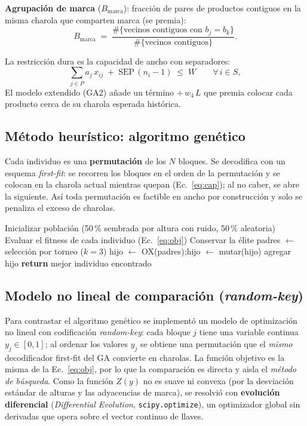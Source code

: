 \documentclass[11pt,letterpaper]{article}
\begin{document}
\noindent\textbf{Agrupaci\'on de marca} ($B_{\text{marca}}$): fracci\'on de pares de
productos contiguos en la misma charola que comparten marca (se premia):
\begin{equation}
B_{\text{marca}} \;=\;
\frac{\#\{\text{vecinos contiguos con } b_j=b_k\}}{\#\{\text{vecinos contiguos}\}}.
\label{eq:marca}
\end{equation}

La restricci\'on dura es la capacidad de ancho con separadores:
\begin{equation}
\sum_{j\in P} a_j\, x_{ij} \;+\; \text{SEP}\,(n_i-1) \;\le\; W
\qquad \forall\, i\in S,
\label{eq:cap}
\end{equation}
El modelo extendido (GA2) a\~nade un t\'ermino $+\,w_4\,L$ que premia colocar cada
producto cerca de su charola esperada hist\'orica.

\subsection{M\'etodo heur\'istico: algoritmo gen\'etico}
Cada individuo es una \textbf{permutaci\'on} de los $N$ bloques. Se decodifica con un
esquema \emph{first-fit}: se recorren los bloques en el orden de la permutaci\'on y
se colocan en la charola actual mientras quepan (Ec.~\eqref{eq:cap}); al no caber, se
abre la siguiente. As\'i toda permutaci\'on es factible en ancho por construcci\'on y
solo se penaliza el exceso de charolas.

\begin{algorithm}[H]
\caption{Algoritmo gen\'etico para el acomodo de planograma}
\begin{algorithmic}[1]
\State Inicializar poblaci\'on (50\,\% sembrada por altura con ruido, 50\,\% aleatoria)
  \State Evaluar el fitness de cada individuo (Ec.~\eqref{eq:obj})
  \State Conservar la \'elite
    \State padres $\gets$ selecci\'on por torneo ($k=3$)
    \State hijo $\gets$ OX(padres);\quad hijo $\gets$ mutar(hijo)
    \State agregar hijo
  \EndWhile
\EndFor
\State \textbf{return} mejor individuo encontrado
\end{algorithmic}
\end{algorithm}

\subsection{Modelo no lineal de comparaci\'on (\emph{random-key})}
Para contrastar el algoritmo gen\'etico se implement\'o un modelo de optimizaci\'on
no lineal con codificaci\'on \emph{random-key}: cada bloque $j$ tiene una variable
continua $y_j\in[0,1]$; al ordenar los valores $y_j$ se obtiene una permutaci\'on que
el \emph{mismo} decodificador first-fit del GA convierte en charolas. La funci\'on
objetivo es la misma de la Ec.~\eqref{eq:obj}, por lo que la comparaci\'on es directa
y aisla el \emph{m\'etodo de b\'usqueda}. Como la funci\'on $Z(y)$ no es suave ni
convexa (por la desviaci\'on est\'andar de alturas y las adyacencias de marca), se
resolvi\'o con \textbf{evoluci\'on diferencial} (\emph{Differential Evolution},
\texttt{scipy.optimize}), un optimizador global sin derivadas que opera sobre el
vector continuo de llaves.
\end{document}
